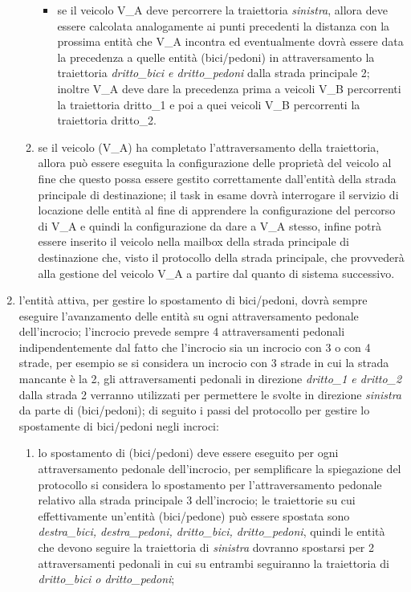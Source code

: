 \begin{enumerate}
\begin{enumerate}
\begin{itemize}
\item se il veicolo V\_A deve percorrere la traiettoria \textit{sinistra}, allora deve essere calcolata analogamente ai punti precedenti la distanza con la prossima entità che V\_A incontra ed eventualmente dovrà essere data la precedenza a quelle entità (bici/pedoni) in attraversamento la traiettoria \textit{drit\-to\_bi\-ci e drit\-to\_pe\-do\-ni} dalla strada principale 2; inoltre V\_A deve dare la precedenza prima a veicoli V\_B percorrenti la traiettoria dritto\_1 e poi a quei veicoli V\_B percorrenti la traiettoria dritto\_2.
\end{itemize}
\item se il veicolo (V\_A) ha completato l'attraversamento della traiettoria, allora può essere eseguita la configurazione delle proprietà del veicolo al fine che questo possa essere gestito correttamente dall'entità della strada principale di destinazione; il task in esame dovrà interrogare il servizio di locazione delle entità al fine di apprendere la configurazione del percorso di V\_A e quindi la configurazione da dare a V\_A stesso, infine potrà essere inserito il veicolo nella mailbox della strada principale di destinazione che, visto il protocollo della strada principale, che provvederà alla gestione del veicolo V\_A a partire dal quanto di sistema successivo.
\end{enumerate}
\item l'entità attiva, per gestire lo spostamento di bici/pedoni, dovrà sempre eseguire l'avanzamento delle entità su ogni attraversamento pedonale dell'incrocio; l'incrocio prevede sempre 4 attraversamenti pedonali indipendentemente dal fatto che l'incrocio sia un incrocio con 3 o con 4 strade, per esempio se si considera un incrocio con 3 strade in cui la strada mancante è la 2, gli attraversamenti pedonali in direzione \textit{dritto\_1 e dritto\_2} dalla strada 2 verranno utilizzati per permettere le svolte in direzione \textit{sinistra} da parte di (bici/pedoni); di seguito i passi del protocollo per gestire lo spostamente di bici/pedoni negli incroci:
\begin{enumerate}
\item lo spostamento di (bici/pedoni) deve essere eseguito per ogni attraversamento pedonale dell'incrocio, per semplificare la spiegazione del protocollo si considera lo spostamento per l'attraversamento pedonale relativo alla strada principale 3 dell'incrocio; le traiettorie su cui effettivamente un'entità (bici/pedone) può essere spostata sono \textit{des\-tra\_bi\-ci, des\-tra\_pe\-do\-ni, drit\-to\_bi\-ci, drit\-to\_pe\-do\-ni}, quindi le entità che devono seguire la traiettoria di \textit{sinistra} dovranno spostarsi per 2 attraversamenti pedonali in cui su entrambi seguiranno la traiettoria di \textit{drit\-to\_bi\-ci o drit\-to\_pe\-do\-ni};

\end{enumerate}
\end{enumerate}
